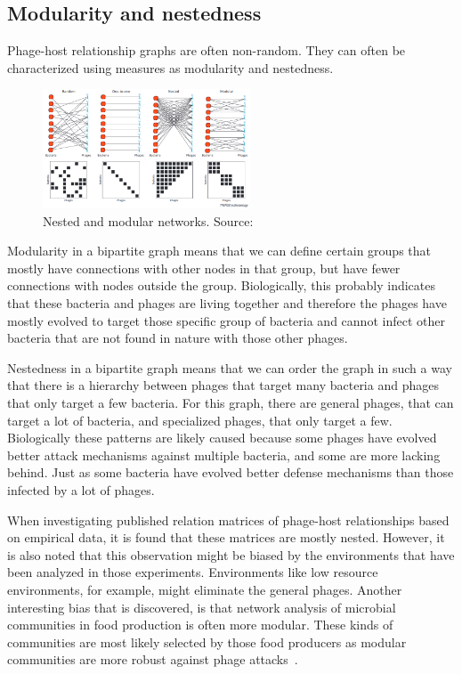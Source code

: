 \documentclass{article}
\begin{document}
\subsection{Modularity and nestedness}

Phage-host relationship graphs are often non-random. They can often be
characterized using measures as modularity and nestedness.

\begin{figure}[hb]
\centering
\includegraphics[width=0.55\textwidth]{img/nested_and_modular.png}
\caption{Nested and modular networks. Source:~\cite{weitz2013phage}}
\end{figure}

Modularity in a bipartite graph means that we can define certain
groups that mostly have connections with other nodes in that group, but have fewer
connections with nodes outside the group. Biologically, this probably indicates
that these bacteria and phages are living together and therefore the phages
have mostly evolved to target those specific group of bacteria and cannot
infect other bacteria that are not found in nature with those other phages. 

Nestedness in a bipartite graph means that we can order the graph in such a 
way that there is a hierarchy between phages that target many bacteria 
and phages that only target a few bacteria. For this graph, there are 
general phages, that can target a lot of bacteria, and specialized phages, 
that only target a few. Biologically these patterns are likely caused because
some phages have evolved better attack mechanisms against multiple bacteria,
and some are more lacking behind. Just as some bacteria have evolved better
defense mechanisms than those infected by a lot of phages. 

When investigating published relation matrices of phage-host relationships 
based on empirical data, it is found that these matrices are mostly nested.
However, it is also noted that this observation might be biased by the environments
that have been analyzed in those experiments. Environments like low resource environments,
for example, might eliminate the general phages. Another interesting bias that is discovered,
is that network analysis of microbial communities in food production is often
more modular. These kinds of communities are most likely selected by those food producers
as modular communities are more robust against phage attacks~\cite{weitz2013phage}.
\end{document}
